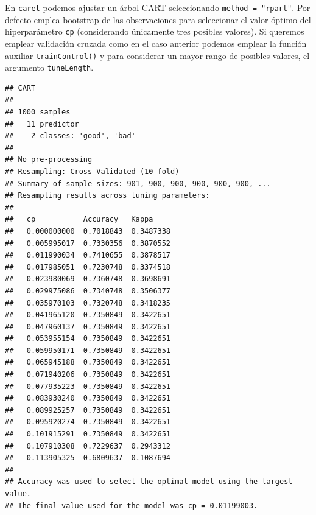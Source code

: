 \documentclass[
  spanish,
]{book}
\newenvironment{Shaded}{\begin{snugshade}}{\end{snugshade}}
\newcommand{\CommentTok}[1]{\textcolor[rgb]{0.56,0.35,0.01}{\textit{#1}}}
\newcommand{\DataTypeTok}[1]{\textcolor[rgb]{0.13,0.29,0.53}{#1}}
\newcommand{\DecValTok}[1]{\textcolor[rgb]{0.00,0.00,0.81}{#1}}
\newcommand{\KeywordTok}[1]{\textcolor[rgb]{0.13,0.29,0.53}{\textbf{#1}}}
\newcommand{\NormalTok}[1]{#1}
\newcommand{\OperatorTok}[1]{\textcolor[rgb]{0.81,0.36,0.00}{\textbf{#1}}}
\newcommand{\StringTok}[1]{\textcolor[rgb]{0.31,0.60,0.02}{#1}}
\theoremstyle{break}
\theoremstyle{definition}
\theoremstyle{definition}
\theoremstyle{definition}
\theoremstyle{remark}
\begin{document}
En \texttt{caret} podemos ajustar un árbol CART seleccionando \texttt{method\ =\ "rpart"}.
Por defecto emplea bootstrap de las observaciones para seleccionar el valor óptimo del hiperparámetro \texttt{cp} (considerando únicamente tres posibles valores).
Si queremos emplear validación cruzada como en el caso anterior podemos emplear la función auxiliar \texttt{trainControl()} y para considerar un mayor rango de posibles valores, el argumento \texttt{tuneLength}.

\begin{Shaded}
\end{Shaded}

\begin{verbatim}
## CART 
## 
## 1000 samples
##   11 predictor
##    2 classes: 'good', 'bad' 
## 
## No pre-processing
## Resampling: Cross-Validated (10 fold) 
## Summary of sample sizes: 901, 900, 900, 900, 900, 900, ... 
## Resampling results across tuning parameters:
## 
##   cp           Accuracy   Kappa    
##   0.000000000  0.7018843  0.3487338
##   0.005995017  0.7330356  0.3870552
##   0.011990034  0.7410655  0.3878517
##   0.017985051  0.7230748  0.3374518
##   0.023980069  0.7360748  0.3698691
##   0.029975086  0.7340748  0.3506377
##   0.035970103  0.7320748  0.3418235
##   0.041965120  0.7350849  0.3422651
##   0.047960137  0.7350849  0.3422651
##   0.053955154  0.7350849  0.3422651
##   0.059950171  0.7350849  0.3422651
##   0.065945188  0.7350849  0.3422651
##   0.071940206  0.7350849  0.3422651
##   0.077935223  0.7350849  0.3422651
##   0.083930240  0.7350849  0.3422651
##   0.089925257  0.7350849  0.3422651
##   0.095920274  0.7350849  0.3422651
##   0.101915291  0.7350849  0.3422651
##   0.107910308  0.7229637  0.2943312
##   0.113905325  0.6809637  0.1087694
## 
## Accuracy was used to select the optimal model using the largest value.
## The final value used for the model was cp = 0.01199003.
\end{verbatim}
\end{document}
